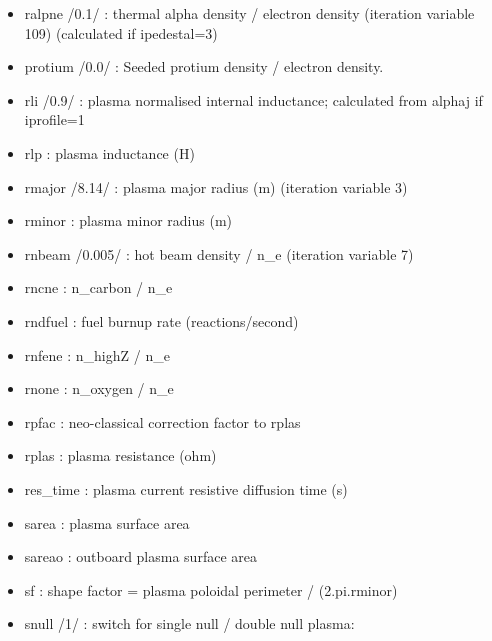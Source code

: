 \documentclass[]{article}
\begin{document}
\begin{itemize}
\item
  ralpne /0.1/ : thermal alpha density / electron density (iteration
  variable 109) (calculated if ipedestal=3)
\item
  protium /0.0/ : Seeded protium density / electron density.
\item
  rli /0.9/ : plasma normalised internal inductance; calculated from
  alphaj if iprofile=1
\item
  rlp : plasma inductance (H)
\item
  rmajor /8.14/ : plasma major radius (m) (iteration variable 3)
\item
  rminor : plasma minor radius (m)
\item
  rnbeam /0.005/ : hot beam density / n\_e (iteration variable 7)
\item
  rncne : n\_carbon / n\_e
\item
  rndfuel : fuel burnup rate (reactions/second)
\item
  rnfene : n\_highZ / n\_e
\item
  rnone : n\_oxygen / n\_e
\item
  rpfac : neo-classical correction factor to rplas
\item
  rplas : plasma resistance (ohm)
\item
  res\_time : plasma current resistive diffusion time (s)
\item
  sarea : plasma surface area
\item
  sareao : outboard plasma surface area
\item
  sf : shape factor = plasma poloidal perimeter / (2.pi.rminor)
\item
  snull /1/ : switch for single null / double null plasma:


\end{itemize}
\end{document}
